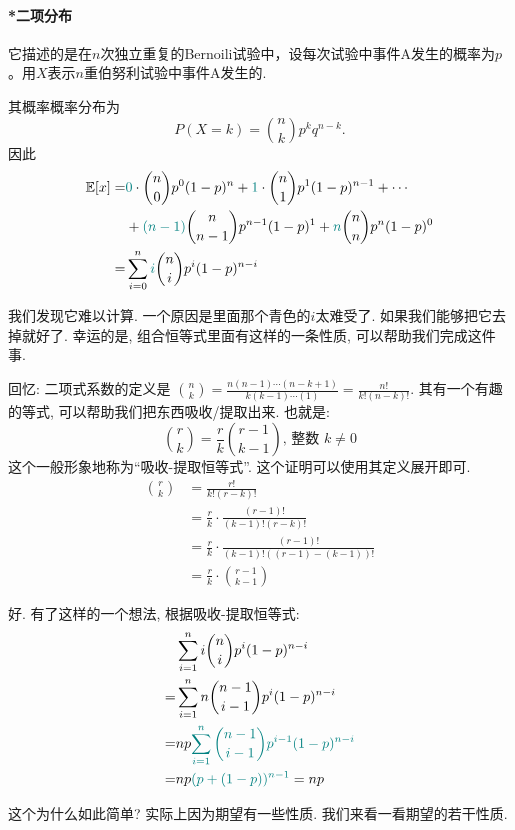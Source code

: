     \begin{shaded}
        \paragraph{*二项分布} 它描述的是在$n$次独立重复的Bernoili试验中，设每次试验中事件A发生的概率为$p$。用$X$表示$n$重伯努利试验中事件A发生的{}.

        其概率概率分布为$$P(X=k)={n\choose k} p^k q^{n-k}.$$
        因此
    $$
\begin{aligned}
\mathbb E[x]= & {{\color{teal}0}} \cdot {n \choose 0} p^0(1-p)^n+{{\color{teal}1}} \cdot\binom n1 p^1(1-p)^{n-1}+\cdots \\
& +{{\color{teal}(n-1)}}\binom n{n-1} p^{n-1}(1-p)^1  +{{\color{teal}n}}\binom nn
 p^n(1-p)^0 \\
= & \sum_{i=0}^n {{\color{teal}i}}\binom ni p^i(1-p)^{n-i}
\end{aligned}
$$

我们发现它难以计算. 一个原因是里面那个青色的$i$太难受了. 如果我们能够把它去掉就好了. 幸运的是, 组合恒等式里面有这样的一条性质, 可以帮助我们完成这件事. 

回忆: 二项式系数的定义是 $\binom nk = \frac{n(n-1) \cdots(n-k+1)}{k(k-1) \cdots(1)}=\frac{n !}{k !(n-k) !}$. 其有一个有趣的等式, 可以帮助我们把东西吸收/提取出来. 也就是: 
$$
\binom rk=\frac{r}{k}\binom{r-1}{k-1} \text {, 整数 } k \neq 0
$$
这个一般形象地称为``吸收-提取恒等式''. 这个证明可以使用其定义展开即可. 
$$
\begin{aligned}
\binom rk & =\frac{r !}{k !(r-k) !} \\
& =\frac{r}{k} \cdot \frac{(r-1) !}{(k-1) !(r-k) !} \\
& =\frac{r}{k} \cdot \frac{(r-1) !}{(k-1) !((r-1)-(k-1)) !} \\
& =\frac{r}{k} \cdot \binom {r-1}{k-1}
\end{aligned}
$$


好. 有了这样的一个想法,  根据吸收-提取恒等式:
$$
\begin{aligned}
& \sum_{i=1}^n i\binom ni p^i(1-p)^{n-i} \\
= & \sum_{i=1}^n n\binom{n-1}{i-1} p^i(1-p)^{n-i} \\
= & n p {{\color{teal}\sum_{i=1}^n\binom{n-1}{i-1} p^{i-1}(1-p)^{n-i}}} \\
= & n p{{\color{teal}(p+(1-p))^{n-1}}}=n p
\end{aligned}
$$

这个为什么如此简单? 实际上因为期望有一些性质. 我们来看一看期望的若干性质. 
    \end{shaded}

